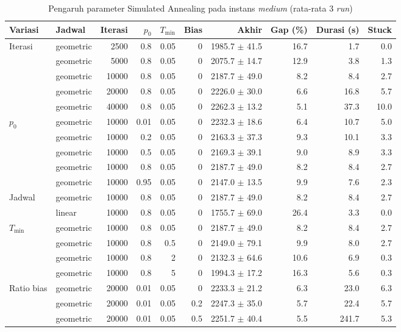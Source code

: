 \begin{table}[H]\centering\scriptsize
\caption{Pengaruh parameter Simulated Annealing pada instans \textit{medium} (rata-rata 3 \textit{run})}\label{tab:sa-params}
\begin{adjustbox}{max width=\textwidth}\begin{tabular}{l l r r r r r r r r}
\toprule
\textbf{Variasi} & \textbf{Jadwal} & \textbf{Iterasi} & \textbf{$p_0$} & \textbf{$T_{\min}$} & \textbf{Bias} & \textbf{Akhir} & \textbf{Gap (\%)} & \textbf{Durasi (s)} & \textbf{Stuck} \\
\midrule
\multirow{5}{*}{Iterasi} & geometric & 2500 & 0.8 & 0.05 & 0 & 1985.7 $\pm$ 41.5 & 16.7 & 1.7 & 0.0 \\
 & geometric & 5000 & 0.8 & 0.05 & 0 & 2075.7 $\pm$ 14.7 & 12.9 & 3.8 & 1.3 \\
 & geometric & 10000 & 0.8 & 0.05 & 0 & 2187.7 $\pm$ 49.0 & 8.2 & 8.4 & 2.7 \\
 & geometric & 20000 & 0.8 & 0.05 & 0 & 2226.0 $\pm$ 30.0 & 6.6 & 16.8 & 5.7 \\
 & geometric & 40000 & 0.8 & 0.05 & 0 & 2262.3 $\pm$ 13.2 & 5.1 & 37.3 & 10.0 \\
\midrule
\multirow{5}{*}{$p_0$} & geometric & 10000 & 0.01 & 0.05 & 0 & 2232.3 $\pm$ 18.6 & 6.4 & 10.7 & 5.0 \\
 & geometric & 10000 & 0.2 & 0.05 & 0 & 2163.3 $\pm$ 37.3 & 9.3 & 10.1 & 3.3 \\
 & geometric & 10000 & 0.5 & 0.05 & 0 & 2169.3 $\pm$ 39.1 & 9.0 & 8.9 & 3.3 \\
 & geometric & 10000 & 0.8 & 0.05 & 0 & 2187.7 $\pm$ 49.0 & 8.2 & 8.4 & 2.7 \\
 & geometric & 10000 & 0.95 & 0.05 & 0 & 2147.0 $\pm$ 13.5 & 9.9 & 7.6 & 2.3 \\
\midrule
\multirow{2}{*}{Jadwal} & geometric & 10000 & 0.8 & 0.05 & 0 & 2187.7 $\pm$ 49.0 & 8.2 & 8.4 & 2.7 \\
 & linear & 10000 & 0.8 & 0.05 & 0 & 1755.7 $\pm$ 69.0 & 26.4 & 3.3 & 0.0 \\
\midrule
\multirow{4}{*}{$T_{\min}$} & geometric & 10000 & 0.8 & 0.05 & 0 & 2187.7 $\pm$ 49.0 & 8.2 & 8.4 & 2.7 \\
 & geometric & 10000 & 0.8 & 0.5 & 0 & 2149.0 $\pm$ 79.1 & 9.9 & 8.0 & 2.7 \\
 & geometric & 10000 & 0.8 & 2 & 0 & 2132.3 $\pm$ 64.6 & 10.6 & 6.9 & 0.3 \\
 & geometric & 10000 & 0.8 & 5 & 0 & 1994.3 $\pm$ 17.2 & 16.3 & 5.6 & 0.3 \\
\midrule
\multirow{3}{*}{Ratio bias} & geometric & 20000 & 0.01 & 0.05 & 0 & 2233.3 $\pm$ 21.2 & 6.3 & 23.0 & 6.3 \\
 & geometric & 20000 & 0.01 & 0.05 & 0.2 & 2247.3 $\pm$ 35.0 & 5.7 & 22.4 & 5.7 \\
 & geometric & 20000 & 0.01 & 0.05 & 0.5 & 2251.7 $\pm$ 40.4 & 5.5 & 241.7 & 5.3 \\
\bottomrule
\end{tabular}\end{adjustbox}
\end{table}
